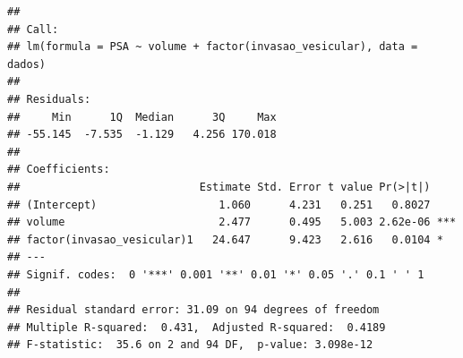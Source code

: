 \documentclass[runningheads]{llncs}\usepackage[]{graphicx}\usepackage[]{color}
\makeatletter
\newenvironment{kframe}{%
 \def\at@end@of@kframe{}%
 \ifinner\ifhmode%
  \def\at@end@of@kframe{\end{minipage}}%
  \begin{minipage}{\columnwidth}%
 \fi\fi%
 \def\FrameCommand##1{\hskip\@totalleftmargin \hskip-\fboxsep
 \colorbox{shadecolor}{##1}\hskip-\fboxsep
     \hskip-\linewidth \hskip-\@totalleftmargin \hskip\columnwidth}%
 \MakeFramed {\advance\hsize-\width
   \@totalleftmargin\z@ \linewidth\hsize
   \@setminipage}}%
 {\par\unskip\endMakeFramed%
 \at@end@of@kframe}
\newenvironment{knitrout}{}{} %
\makeatother
\begin{document}
\begin{knitrout}
\color{fgcolor}\begin{kframe}
\begin{verbatim}
## 
## Call:
## lm(formula = PSA ~ volume + factor(invasao_vesicular), data = dados)
## 
## Residuals:
##     Min      1Q  Median      3Q     Max 
## -55.145  -7.535  -1.129   4.256 170.018 
## 
## Coefficients:
##                            Estimate Std. Error t value Pr(>|t|)    
## (Intercept)                   1.060      4.231   0.251   0.8027    
## volume                        2.477      0.495   5.003 2.62e-06 ***
## factor(invasao_vesicular)1   24.647      9.423   2.616   0.0104 *  
## ---
## Signif. codes:  0 '***' 0.001 '**' 0.01 '*' 0.05 '.' 0.1 ' ' 1
## 
## Residual standard error: 31.09 on 94 degrees of freedom
## Multiple R-squared:  0.431,	Adjusted R-squared:  0.4189 
## F-statistic:  35.6 on 2 and 94 DF,  p-value: 3.098e-12
\end{verbatim}
\end{kframe}
\end{knitrout}
\end{document}
